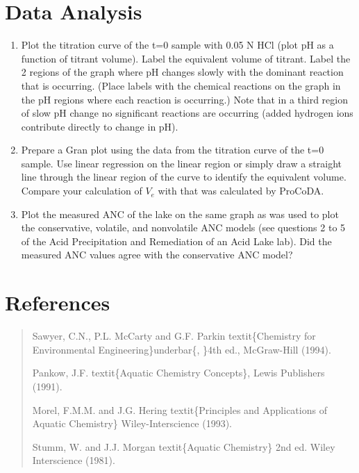 \documentclass[letterpaper,10pt,english]{sphinxmanual}
\begin{document}
\section{Data Analysis}
\label{\detokenize{Acid_Neutralizing_Capacity/Acid_Neutralizing_Capacity:data-analysis}}\label{\detokenize{Acid_Neutralizing_Capacity/Acid_Neutralizing_Capacity:heading-anc-data-analysis}}\begin{enumerate}
\item {} 
Plot the titration curve of the t=0 sample with 0.05 N HCl (plot pH as a function of titrant volume). Label the equivalent volume of titrant. Label the 2 regions of the graph where pH changes slowly with the dominant reaction that is occurring. (Place labels with the chemical reactions on the graph in the pH regions where each reaction is occurring.) Note that in a third region of slow pH change no significant reactions are occurring (added hydrogen ions contribute directly to change in pH).

\item {} 
Prepare a Gran plot using the data from the titration curve of the t=0 sample. Use linear regression on the linear region or simply draw a straight line through the linear region of the curve to identify the equivalent volume. Compare your calculation of \(V_e\) with that was calculated by ProCoDA.

\item {} 
Plot the measured ANC of the lake on the same graph as was used to plot the conservative, volatile, and nonvolatile ANC models (see questions 2 to 5 of the Acid Precipitation and Remediation of an Acid Lake lab). Did the measured ANC values agree with the conservative ANC model?

\end{enumerate}


\section{References}
\label{\detokenize{Acid_Neutralizing_Capacity/Acid_Neutralizing_Capacity:references}}\label{\detokenize{Acid_Neutralizing_Capacity/Acid_Neutralizing_Capacity:heading-anc-references}}\begin{quote}

Sawyer, C.N., P.L. McCarty and G.F. Parkin textit\{Chemistry for Environmental Engineering\}underbar\{, \}4th ed., McGraw-Hill (1994).

Pankow, J.F. textit\{Aquatic Chemistry Concepts\}, Lewis Publishers (1991).

Morel, F.M.M. and J.G. Hering textit\{Principles and Applications of Aquatic Chemistry\} Wiley-Interscience (1993).

Stumm, W. and J.J. Morgan textit\{Aquatic Chemistry\} 2nd ed. Wiley Interscience (1981).
\end{quote}
\end{document}
